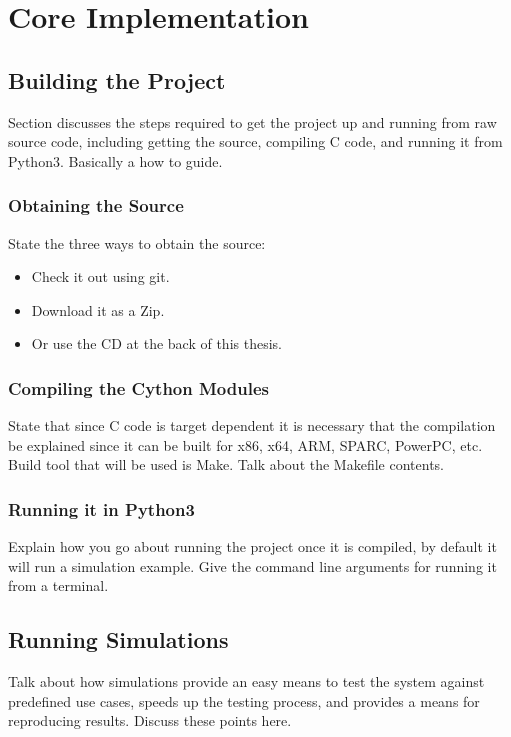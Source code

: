 \chapter{Core Implementation}


\section{Building the Project}
Section discusses the steps required to get the project up and running from raw source code, including getting the source, compiling C code, and running it from Python3. Basically a how to guide.

\subsection{Obtaining the Source}
State the three ways to obtain the source:

\begin{itemize}
\item Check it out using git.
\item Download it as a Zip.
\item Or use the CD at the back of this thesis.
\end{itemize}

\subsection{Compiling the Cython Modules}
State that since C code is target dependent it is necessary that the compilation be explained since it can be built for x86, x64, ARM, SPARC, PowerPC, etc. Build tool that will be used is Make. Talk about the Makefile contents.

\subsection{Running it in Python3}
Explain how you go about running the project once it is compiled, by default it will run a simulation example. Give the command line arguments for running it from a terminal.


\section{Running Simulations}
Talk about how simulations provide an easy means to test the system against predefined use cases, speeds up the testing process, and provides a means for reproducing results. Discuss these points here.

